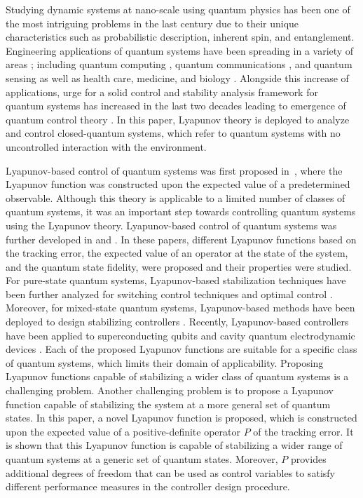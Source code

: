 \documentclass[journal]{IEEEtran}
\theoremstyle{definition}
\begin{document}
\par Studying dynamic systems at nano-scale using quantum physics has been one of the most intriguing problems in the last century due to their unique characteristics such as probabilistic description, inherent spin, and entanglement. Engineering applications of quantum systems have been spreading in a variety of areas \cite{dowling2003quantum}; including quantum computing \cite{divincenzo1995quantum}, quantum communications \cite{holevo1979capacity,pirandola2019end}, and quantum sensing \cite{giovannetti2006quantum,pirandola2018advances} as well as health care, medicine, and biology \cite{kislyakov2019physics,mcfadden2016life,poggiali2018optimal}. Alongside this increase of applications, urge for a solid control and stability analysis framework for quantum systems has increased in the last two decades leading to emergence of quantum control theory \cite{PhysRevLett.68.1500,Warren1581,belavkin1987non}. In this paper, Lyapunov theory is deployed to analyze and control closed-quantum systems, which refer to quantum systems with no uncontrolled interaction with the environment.

\par Lyapunov-based control of quantum systems was first proposed in~\cite{grivopoulos2003lyapunov}, where the Lyapunov function was constructed upon the expected value of a predetermined observable. Although this theory is applicable to a limited number of classes of quantum systems, it was an important step towards controlling quantum systems using the Lyapunov theory. Lyapunov-based control of quantum systems was further developed in \cite{mirrahimi2005lyapunov} and \cite{kuang2008lyapunov}. In these papers, different Lyapunov functions based on the tracking error, the expected value of an operator at the state of the system, and the quantum state fidelity, were proposed and their properties were studied. For pure-state quantum systems, Lyapunov-based stabilization techniques have been further analyzed for switching control techniques \cite{zhao2012switching} and optimal control \cite{hou2012optimal,wang2014optimal}. Moreover, for mixed-state quantum systems, Lyapunov-based methods have been deployed to design stabilizing controllers \cite{wang2010analysis}. Recently, Lyapunov-based controllers have been applied to superconducting qubits \cite{zeng2018quantum,ji2018lyapunov} and cavity quantum electrodynamic devices \cite{li2018driving,ran2018high}. Each of the proposed Lyapunov functions are suitable for a specific class of quantum systems, which limits their domain of applicability. Proposing Lyapunov functions capable of stabilizing a wider class of quantum systems is a challenging problem. Another challenging problem is to propose a Lyapunov function capable of stabilizing the system at a more general set of quantum states. In this paper, a novel Lyapunov function is proposed, which is constructed upon the expected value of a positive-definite operator $P$ of the tracking error. It is shown that this Lyapunov function is capable of stabilizing a wider range of quantum systems at a generic set of quantum states. Moreover, $P$ provides additional degrees of freedom that can be used as control variables to satisfy different performance measures in the controller design procedure.
\end{document}
